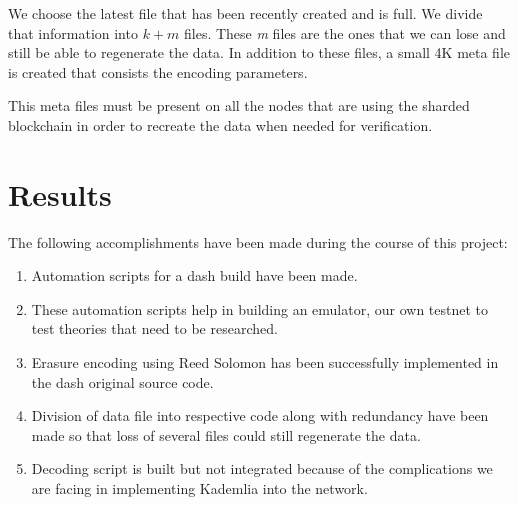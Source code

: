 \documentclass[conference]{IEEEtran}
\begin{document}
We choose the latest file that has been recently created and is full. We divide that
information into $k+ m$ files. These \textit{m} files are the ones that we can 
lose and still be able to regenerate the data. In addition to these files, a small 4K
meta file is created that consists the encoding parameters.

This meta files must be present on all the nodes that are using the sharded blockchain
in order to recreate the data when needed for verification.

\section{Results}
The following accomplishments have been made during the course of this project:

\begin{enumerate}
    \item Automation scripts for a dash build have been made.
    \item These automation scripts help in building an emulator, our own testnet to test
        theories that need to be researched.
    \item Erasure encoding using Reed Solomon has been successfully implemented in the 
        dash original source code.
    \item Division of data file into respective code along with redundancy have been made
        so that loss of several files could still regenerate the data.
    \item Decoding script is built but not integrated because of the complications we are 
        facing in implementing Kademlia into the network.
\end{enumerate}
\end{document}
